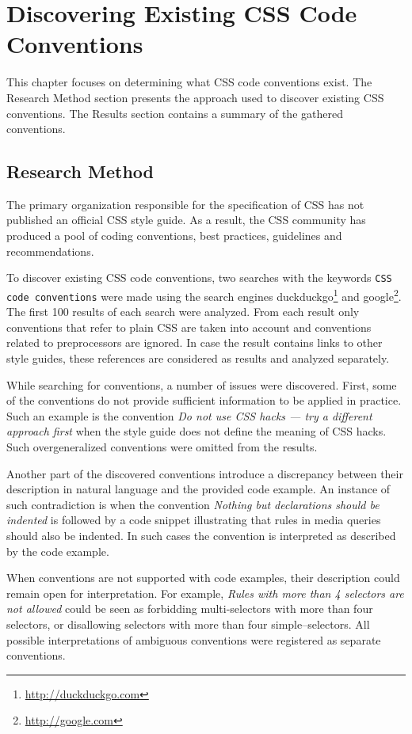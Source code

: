 \chapter{Discovering Existing CSS Code Conventions}
\label{sec:discovering}

This chapter focuses on determining what CSS code conventions exist. The
Research Method section presents the approach used to discover existing CSS
conventions. The Results section contains a summary of the gathered
conventions.

\section{Research Method}

The primary organization responsible for the specification of CSS has not
published an official CSS style guide. As a result, the CSS community has
produced a pool of coding conventions, best practices, guidelines and
recommendations.

To discover existing CSS code conventions, two searches with the keywords
\texttt{CSS code conventions} were made using the search engines
duckduckgo\footnote{\url{http://duckduckgo.com}} and
google\footnote{\url{http://google.com}}. The first 100 results of each search
were analyzed. From each result only conventions that refer to plain CSS are
taken into account and conventions related to preprocessors are ignored. In
case the result contains links to other style guides, these references are
considered as results and analyzed separately.

While searching for conventions, a number of issues were discovered. First,
some of the conventions do not provide sufficient information to be applied in
practice. Such an example is the convention \textit{Do not use CSS hacks --- try
a different approach first} when the style guide does not define the meaning
of CSS hacks. Such overgeneralized conventions were omitted from the results.

Another part of the discovered conventions introduce a discrepancy between
their description in natural language and the provided code example. An
instance of such contradiction is when the convention \textit{Nothing but
declarations should be indented} is followed by a code snippet illustrating
that rules in media queries should also be indented. In such cases the
convention is interpreted as described by the code example.

When conventions are not supported with code examples, their description could
remain open for interpretation. For example, \textit{Rules with more than 4
selectors are not allowed} could be seen as forbidding multi-selectors with
more than four selectors, or disallowing selectors with more than four simple--selectors. All possible interpretations of ambiguous conventions were
registered as separate conventions.


